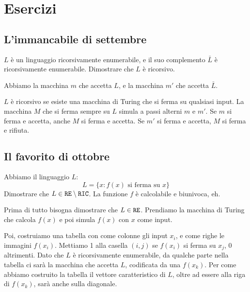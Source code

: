
\usepackage{algorithm}
\usepackage{algpseudocode}

\renewcommand{\algorithmicrequire}{\textbf{Input:}}
\renewcommand{\algorithmicensure}{\textbf{Output:}}



% 

\chapter{Esercizi}

\section{L'immancabile di settembre}

\begin{esercizio}
$L$ \`e un linguaggio ricorsivamente enumerabile, e il suo complemento $\bar{L}$ \`e ricorsivamente enumerabile. Dimostrare che $L$ \`e ricorsivo.
\end{esercizio}

Abbiamo la macchina $m$ che accetta $L$, e la macchina $m'$ che accetta $\bar{L}$.

$L$ \`e ricorsivo se esiste una macchina di Turing che si ferma su qualsiasi input. La macchina $M$ che si ferma sempre su $L$ simula a passi alterni $m$ e $m'$. Se $m$ si ferma e accetta, anche $M$ si ferma e accetta. Se $m'$ si ferma e accetta, $M$ si ferma e rifiuta.

\section{Il favorito di ottobre}

\begin{esercizio}
Abbiamo il linguaggio $L$:
\[
L = \{ x : f(x) \text{ si ferma su } x \}
\]
Dimostrare che $L \in \texttt{RE} \setminus \texttt{RIC}$. La funzione $f$ \`e calcolabile e biunivoca, eh.
\end{esercizio}

Prima di tutto bisogna dimostrare che $L \in \texttt{RE}$. Prendiamo la macchina di Turing che calcola $f(x)$ e poi simula $f(x)$ con $x$ come input.

Poi, costruiamo una tabella con come colonne gli input $x_i$, e come righe le immagini $f(x_i)$. Mettiamo 1 alla casella $(i,j)$ se $f(x_i)$ si ferma su $x_j$, 0 altrimenti. Dato che $L$ \`e ricorsivamente enumerabile, da qualche parte nella tabella ci sar\`a la macchina che accetta $L$, codificata da una $f(x_k)$. Per come abbiamo costruito la tabella il vettore caratteristico di $L$, oltre ad essere alla riga di $f(x_k)$, sar\`a anche sulla diagonale.

